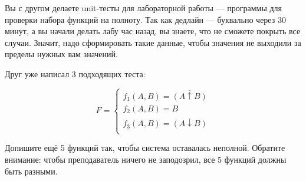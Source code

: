 \question
Вы с другом делаете unit-тесты для лабораторной работы — программы для проверки набора функций на полноту. Так как дедлайн — буквально через 30 минут, а вы начали делать лабу час назад, вы знаете, что не сможете покрыть все случаи. Значит, надо сформировать такие данные, чтобы значения не выходили за пределы нужных вам значений.

Друг уже написал 3 подходящих теста:

\begin{equation*}
    F=
    \begin{cases}
        f_1(A,B)=\overline{(A \uparrow B)}\\
        f_2(A,B)=B\\
        f_3(A,B)=\overline{(A \downarrow B)}\\
    \end{cases}
\end{equation*}
    
Допишите ещё 5 функций так, чтобы система оставалась неполной. Обратите внимание: чтобы преподаватель ничего не заподозрил, все 5 функций должны быть разными.